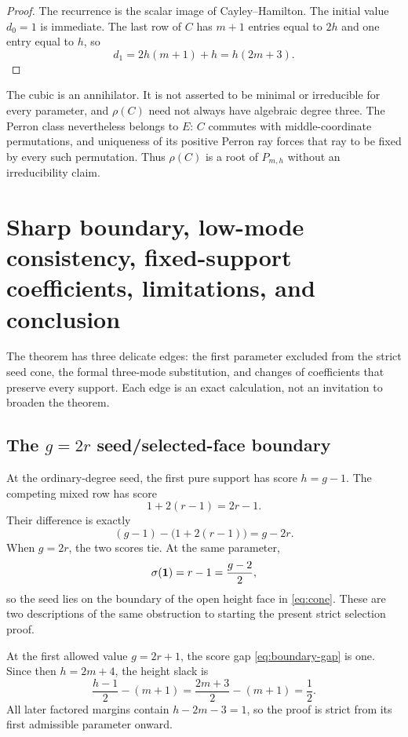 \documentclass[11pt]{article}
\theoremstyle{remark}
\numberwithin{equation}{section}
\begin{document}
\begin{proof}
The recurrence is the scalar image of Cayley--Hamilton.  The initial value
\(d_0=1\) is immediate.  The last row of \(C\) has \(m+1\) entries
equal to \(2h\) and one entry equal to \(h\), so
\[
d_1=2h(m+1)+h=h(2m+3).
\]
\end{proof}

The cubic is an annihilator.  It is not asserted to be minimal or
irreducible for every parameter, and \(\rho(C)\) need not always have
algebraic degree three.  The Perron class nevertheless belongs to \(E\):
\(C\) commutes with middle-coordinate permutations, and uniqueness of its
positive Perron ray forces that ray to be fixed by every such permutation.
Thus \(\rho(C)\) is a root of \(P_{m,h}\) without an irreducibility claim.

\section{Sharp boundary, low-mode consistency, fixed-support coefficients, limitations, and conclusion}\label{sec:boundary}

The theorem has three delicate edges: the first parameter excluded from the
strict seed cone, the formal three-mode substitution, and changes of
coefficients that preserve every support.  Each edge is an exact calculation,
not an invitation to broaden the theorem.

\subsection{The \texorpdfstring{\(g=2r\)}{g=2r} seed/selected-face boundary}

At the ordinary-degree seed, the first pure support has score
\(h=g-1\).  The competing mixed row has score
\[
1+2(r-1)=2r-1.
\]
Their difference is exactly
\begin{equation}\label{eq:boundary-gap}
(g-1)-\bigl(1+2(r-1)\bigr)=g-2r.
\end{equation}
When \(g=2r\), the two scores tie.  At the same parameter,
\begin{equation}\label{eq:boundary-height}
\sigma(\mathbf{1})=r-1=\frac{g-2}{2},
\end{equation}
so the seed lies on the boundary of the open height face in
\eqref{eq:cone}.  These are two descriptions of the same obstruction to
starting the present strict selection proof.

At the first allowed value \(g=2r+1\), the score gap
\eqref{eq:boundary-gap} is one.  Since then \(h=2m+4\), the height slack is
\[
\frac{h-1}{2}-(m+1)
=\frac{2m+3}{2}-(m+1)=\frac12.
\]
All later factored margins contain \(h-2m-3=1\), so the proof is strict
from its first admissible parameter onward.
\end{document}
